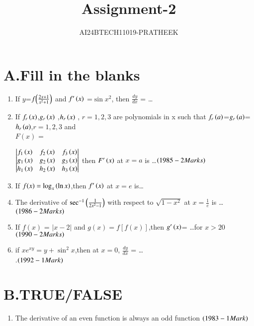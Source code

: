 \documentclass[journal,12pt,onecolumn]{IEEEtran}
\theoremstyle{remark}
\begin{document}

\vspace{3cm}

\title{Assignment-2}
\author{AI24BTECH11019-PRATHEEK}
\maketitle

\bigskip

\renewcommand{\thefigure}{\theenumi}
\renewcommand{\thetable}{\theenumi}

\section*{A.Fill in the blanks}
\begin{enumerate}
    \item If $y$=$f{\left(\frac{2x+1}{x^2+1}\right)}$ and $f^{\prime}\left(x\right)$ =$\sin{x}^2$, then $\frac{dy}{dx}$ = \dots\hfill {} 
    \item If $f_r\left(x\right)$,$g_r\left(x\right)$ ,$h_r\left(x\right)$ , $r=1,2,3$ are polynomials in x such that  $f_r\left(a\right)$=$g_r\left(a\right)$=$h_r\left(a\right)$,$r=1,2,3$ and \\$F(x)$ = 


    $\begin{vmatrix}
			f_1\left(x\right) & f_2\left(x\right) & f_3\left(x\right) \\
			g_1\left(x\right) & g_2\left(x\right) & g_3\left(x\right)\\
			h_1\left(x\right) & h_2\left(x\right)& h_3\left(x\right)
		\end{vmatrix}  $
    then $F^{\prime}\left(x\right)$ at $x=a$ is \dots $\hfill\brak{1985 -2Marks}$
\item If $f(x)=\log_{x}\left(\ln{x}\right)$,then $f^{\prime}\left(x\right)$ at $x=e$ is\dots \hfill {} 
\item The derivative of $\sec^{-1}{\left(\frac{1}{2x^2-1}\right)}$ with respect to $\sqrt{1-x^2}$
at $x=\frac{1}{e}$ is \dots $\hfill\brak{1986 -2Marks}$
\item If $f(x)$ = $|x-2|$ and $g(x)=f[f(x)]$,then $g^{\prime}\left(x\right)$= \dots for $x>20$ $\hfill\brak{1990-2 Marks}$  
\item if $xe^{xy}=y+\sin^2{x}$,then at $x=0$, $\frac{dy}{dx}$ = \dots\\.$\hfill \brak{1992-1Mark}$
\end{enumerate}
\section*{B.TRUE/FALSE}
\begin{enumerate}
    \item The derivative of an even function is always an odd function $\hfill\brak{1983-1 Mark}$
\end{enumerate}
\end{document}
